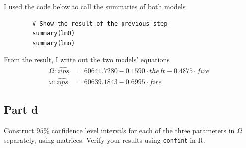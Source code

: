 \begin{answer}
    I used the code below to call the summaries of both models:
    \begin{verbatim}
        # Show the result of the previous step
        summary(lmO)
        summary(lmo)
    \end{verbatim}
    From the result, I write out the two models' equations
    \begin{equation}
        \begin{aligned}
            \Omega: \widehat{zips} & = 60641.7280 - 0.1590 \cdot theft - 0.4875 \cdot fire\\
            \omega: \widehat{zips} & = 60639.1843 - 0.6995 \cdot fire
        \end{aligned}
    \end{equation}
\end{answer}

\subsection{Part d}

\begin{question}
    Construct $95\%$ confidence level intervals for each of the three parameters in $\Omega$ separately, using matrices. Verify your results using \verb+confint+ in R.
\end{question}

